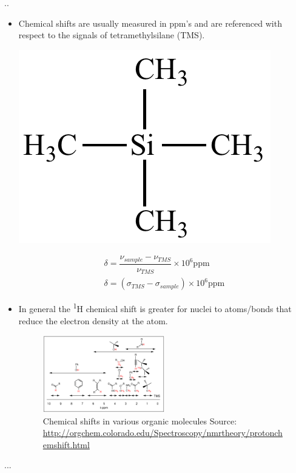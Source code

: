 \documentclass[handout]{beamer}
\begin{document}
\begin{frame}{\thesection.\thesubsection. \insertsubsection}
	\begin{itemize}[<+>]
		\item Chemical shifts are usually measured in ppm's and are referenced with respect to the signals of tetramethylsilane (TMS).		
		
		\begin{minipage}[b]{0.15\textwidth}
            \centering
		  	\includegraphics[scale=0.5]{tetramethylsilane.png}	
		\end{minipage}
		\hspace{0.3cm}
		\begin{minipage}[b]{0.7\textwidth}
			{\footnotesize
		 	\begin{align}
		   	\delta = \dfrac{\nu_{sample} - \nu_{TMS}}{\nu_{TMS}}\times 10^{6} \text{ppm} \\
		   	\delta =  (\sigma_{TMS} - \sigma_{sample}) \times 10^{6} \text{ppm}
		   	\end{align}
		   }%
	    \end{minipage}
			
		
			
		
	
		\item 
		In general the \textsuperscript{1}H chemical shift is greater for nuclei to atoms/bonds that reduce the electron density at the atom. 
		\begin{figure}
		 		\centering
			 	\includegraphics[width=0.50\textwidth]{proton_chemical_shifts.png}
			 	\caption{Chemical shifts in various organic molecules Source: \url{http://orgchem.colorado.edu/Spectroscopy/nmrtheory/protonchemshift.html}}
	 	\end{figure}

	\end{itemize}
	...
\end{frame}
\end{document}
